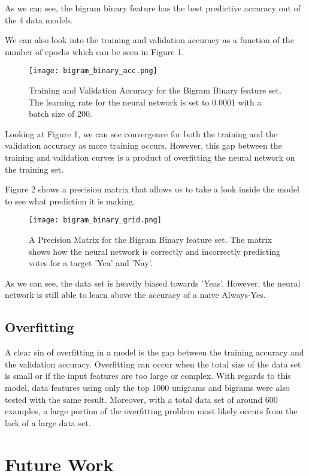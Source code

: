 \documentclass[%
 reprint,
 amsmath,amssymb,
 aps,
]{revtex4-2}
\begin{document}
As we can see, the bigram binary feature has the best predictive accuracy out of the 4 data models.

We can also look into the training and validation accuracy as a function of the number of epochs which can be seen in Figure 1.

\begin{figure}
    \texttt{[image: bigram\_binary\_acc.png]}
    \caption{Training and Validation Accuracy for the Bigram Binary feature set. The learning rate for the neural network is set to 0.0001 with a batch size of 200.}
\end{figure}

Looking at Figure 1, we can see convergence for both the training and the validation accuracy as more training occurs. However, this gap between the training and validation curves is a product of overfitting the neural network on the training set.

Figure 2 shows a precision matrix that allows us to take a look inside the model to see what prediction it is making.

\begin{figure}
    \texttt{[image: bigram\_binary\_grid.png]}
    \caption{A Precision Matrix for the Bigram Binary feature set. The matrix shows how the neural network is correctly and incorrectly predicting votes for a target 'Yea' and 'Nay'.}
\end{figure}

As we can see, the data set is heavily biased towards 'Yeas'. However, the neural network is still able to learn above the accuracy of a naive Always-Yes.

\subsection{Overfitting}

A clear sin of overfitting in a model is the gap between the training accuracy and the validation accuracy. Overfitting can occur when the total size of the data set is small or if the input features are too large or complex. With regards to this model, data features using only the top 1000 unigrams and bigrams were also tested with the same result. Moreover, with a total data set of around 600 examples, a large portion of the overfitting problem most likely occurs from the lack of a large data set.

\section{Future Work}
\end{document}
